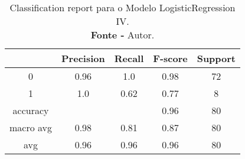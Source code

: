 % 
\begin{table}[H]
    \centering
    \begin{tabular}{@{}ccccc@{}}
    \toprule
     & \textbf{Precision} & \textbf{Recall} &\textbf{F-score} & \textbf{Support} \\ \midrule 
    0 & 0.96 & 1.0 & 0.98 & 72 \\ 
    1 & 1.0 & 0.62 & 0.77 & 8 \\ 
    accuracy &  &  & 0.96 & 80 \\ 
    macro avg & 0.98 & 0.81 & 0.87 & 80 \\ 
    avg & 0.96 & 0.96 & 0.96 & 80 \\ \bottomrule 
    \end{tabular}
    \caption{Classification report para o Modelo LogisticRegression IV. \\ \textbf{Fonte -} Autor.}
    \label{tab: classification-report-Modelo LogisticRegression IV}
\end{table}